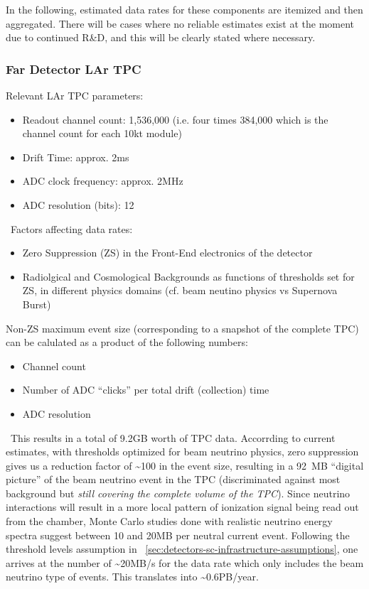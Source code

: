 In the following, estimated data rates for these components are itemized and then aggregated.
There will be cases where no reliable estimates exist at the moment due to continued R\&D, and this will be clearly stated where necessary.

\subsubsection{Far Detector LAr TPC}
Relevant  LAr TPC parameters:
\begin{itemize}
\item Readout channel count: 1,536,000 (i.e. four times 384,000 which is the channel count for each 10kt module)
\item Drift Time: approx. 2ms
\item ADC clock frequency: approx. 2MHz
\item ADC resolution (bits): 12
\end{itemize}
\
Factors affecting data rates:
\begin{itemize}
\item Zero Suppression (ZS)  in the Front-End electronics of the detector
\item Radiolgical and Cosmological Backgrounds as functions of thresholds set for ZS, in different physics domains (cf. beam neutino physics vs Supernova Burst)
\end{itemize}

Non-ZS maximum event size (corresponding to a snapshot of the complete TPC) can be calulated as a product of the following numbers:
\begin{itemize}
\item Channel count
\item Number of ADC ``clicks'' per total drift (collection) time
\item ADC resolution
\end{itemize}
\
This results in a total of 9.2GB worth of TPC data. Accorrding to current estimates, with thresholds optimized for beam neutrino physics, zero suppression
gives us a reduction factor of \textasciitilde 100 in the event size, resulting in a 92~MB ``digital picture'' of the beam neutrino event in the TPC
(discriminated against most background but \textit{still covering the complete volume of the TPC}).
Since neutrino interactions will result in a more local pattern of ionization signal being read out
from the chamber, Monte Carlo studies done with realistic neutrino energy spectra suggest between 10 and 20MB per neutral current event.
Following the threshold levels assumption in ~\ref{sec:detectors-sc-infrastructure-assumptions}, one arrives at the number of \textasciitilde 20MB/s for the data rate
which only includes the beam neutrino type of events. This translates into \textasciitilde 0.6PB/year.

